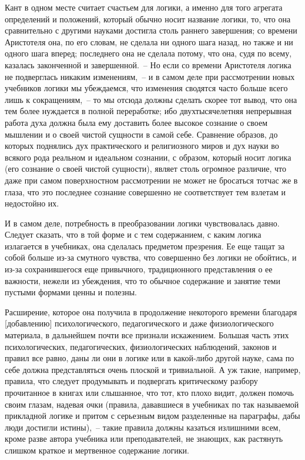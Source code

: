 Кант в одном месте\endnotemark{} считает счастьем для логики,
а именно для того агрегата определений и положений,
который обычно носит название логики, то, что она
сравнительно с другими науками достигла столь раннего
завершения; со времени Аристотеля она, по его словам,
не сделала ни одного шага назад, но также и ни одного
шага вперед; последнего она не сделала потому, что она,
судя по всему, казалась законченной и завершенной.~--
Но если со времени Аристотеля логика не подверглась
никаким изменениям,~-- и в самом деле при рассмотрении
новых учебников логики мы убеждаемся, что
изменения сводятся часто больше всего лишь к сокращениям,~--
то мы отсюда должны сделать скорее тот вывод,
что она тем более нуждается в полной переработке; ибо
двухтысячелетняя непрерывная работа духа должна
была ему доставить более высокое сознание о своем мышлении
и о своей чистой сущности в самой себе. Сравнение
образов, до которых поднялись дух практического и религиозного
миров и дух науки во всякого рода реальном
и идеальном сознании, с образом, который носит логика
(его сознание о своей чистой сущности), являет столь
огромное различие, что даже при самом поверхностном
рассмотрении не может не бросаться тотчас же в глаза,
что это последнее сознание совершенно не соответствует
тем взлетам и недостойно их.


И в самом деле, потребность в преобразовании логики
чувствовалась давно. Следует сказать, что в той форме
и с тем содержанием, с каким логика излагается в учебниках,
она сделалась предметом презрения. Ее еще тащат
за собой больше из-за смутного чувства, что совершенно
без логики не обойтись, и из-за сохранившегося еще привычного,
традиционного представления о ее важности,
нежели из убеждения, что то обычное содержание и занятие
теми пустыми формами ценны и полезны.

Расширение, которое она получила в продолжение
некоторого времени благодаря [добавлению] психологического,
педагогического и даже физиологического материала,
в дальнейшем почти все признали искажением.
Большая часть этих психологических, педагогических,
физиологических наблюдений, законов и правил все равно,
даны ли они в логике или в какой-либо другой науке,
сама по себе должна представляться очень плоской и тривиальной.
А уж такие, например, правила, что следует
продумывать и подвергать критическому разбору прочитанное
в книгах или слышанное, что тот, кто плохо видит,
должен помочь своим глазам, надевая очки (правила,
дававшиеся в учебниках по так называемой прикладной
логике и притом с серьезным видом разделенные на
параграфы, дабы люди достигли истины),~-- такие правила
должны казаться излишними всем, кроме разве автора
учебника или преподавателей, не знающих, как растянуть
слишком краткое и мертвенное содержание
логики\endnotemark{}.

